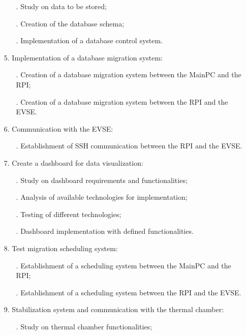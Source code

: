 \begin{itemize}
\begin{itemize}
            \item[.] Study on data to be stored;
            \item[.] Creation of the database schema;
            \item[.] Implementation of a database control system.
        \end{itemize}
    \item[] 5. Implementation of a database migration system:
        \begin{itemize}
            \item [.] Creation of a database migration system between the MainPC and the RPI;
            \item [.] Creation of a database migration system between the RPI and the EVSE.
        \end{itemize}
    \item[] 6. Communication with the EVSE:
        \begin{itemize}
            \item[.] Establishment of SSH communication between the RPI and the EVSE.
        \end{itemize}
    \item[] 7. Create a dashboard for data visualization:
        \begin{itemize}
            \item[.] Study on dashboard requirements and functionalities;
            \item[.] Analysis of available technologies for implementation;
            \item[.] Testing of different technologies;
            \item[.] Dashboard implementation with defined functionalities.
        \end{itemize}
    \item[] 8. Test migration scheduling system: 
        \begin{itemize}
            \item[.] Establishment of a scheduling system between the MainPC and the RPI;
            \item[.] Establishment of a scheduling system between the RPI and the EVSE.
        \end{itemize}
    \item[] 9. Stabilization system and communication with the thermal chamber:
        \begin{itemize}
            \item[.] Study on thermal chamber functionalities;

\end{itemize}
\end{itemize}

